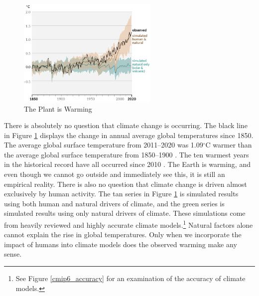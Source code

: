 \begin{figure}
\centering
\caption{The Plant is Warming\label{ipcc1}}
\includegraphics[width=0.6\textwidth]{figures/chapter1_figures/ipcc_fig1.png}
\vspace{1em}
\end{figure}

There is absolutely no question that climate change is occurring. The black line in Figure \ref{ipcc1} displays the change in annual average global temperatures since 1850. The average global surface temperature from 2011--2020 was 1.09$^\circ$C warmer than the average global surface temperature from 1850--1900 \citep{ipcc1_summary}. The ten warmest years in the historical record have all occurred since 2010 \citep{lindsey2023climate}. 
The Earth is warming, and even though we cannot go outside and immediately see this, it is still an empirical reality. There is also no question that climate change is driven almost exclusively by human activity. The tan series in Figure \ref{ipcc1} is simulated results using both human and natural drivers of climate, and the green series is simulated results using only natural drivers of climate. These simulations come from heavily reviewed and highly accurate climate models.\footnote{See Figure \ref{cmip6_accuracy} for an examination of the accuracy of climate models.} Natural factors alone cannot explain the rise in global temperatures. Only when we incorporate the impact of humans into climate models does the observed warming make any sense. 

